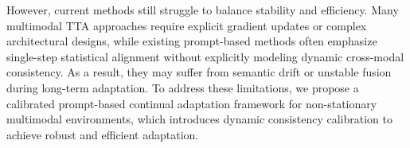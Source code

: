 However, current methods still struggle to balance stability and efficiency. Many multimodal TTA approaches require explicit gradient updates or complex architectural designs, while existing prompt-based methods often emphasize single-step statistical alignment without explicitly modeling dynamic cross-modal consistency. As a result, they may suffer from semantic drift or unstable fusion during long-term adaptation. To address these limitations, we propose a calibrated prompt-based continual adaptation framework for non-stationary multimodal environments, which introduces dynamic consistency calibration to achieve robust and efficient adaptation.

